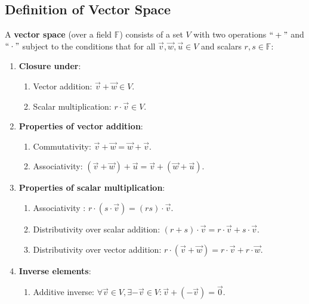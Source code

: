 \subsection{Definition of Vector Space}
\begin{definition}
	\label{def:vector_space}
	A \textbf{vector space} (over a field $\mathbb{F}$) consists of a set $V$ with two operations $``+"$ and $``\cdot"$ subject to the conditions that for all $\vec{v}, \vec{w}, \vec{u}\in V$ and scalars $r, s\in\mathbb{F}$:
	\begin{enumerate}
		\item \textbf{Closure under}:
		\begin{enumerate}[label=\roman*]
			\item Vector addition: $\vec{v} + \vec{w} \in V$.
			\item Scalar multiplication: $r\cdot\vec{v} \in V$.
		\end{enumerate}

		\item \textbf{Properties of vector addition}:
		\begin{enumerate}[label=\roman*]\addtocounter{enumii}{2}
			\item Commutativity: $\vec{v} + \vec{w} = \vec{w} + \vec{v}$.
			\item Associativity: $(\vec{v} + \vec{w}) + \vec{u} = \vec{v} + (\vec{w} + \vec{u})$.
		\end{enumerate} 

		\item \textbf{Properties of scalar multiplication}:
		\begin{enumerate}[label=\roman*]\addtocounter{enumii}{4}
			\item Associativity : $r\cdot(s\cdot\vec{v}) = (rs)\cdot \vec{v}$.
			\item Distributivity over scalar addition: $(r+s)\cdot\vec{v} = r\cdot\vec{v} + s\cdot\vec{v}$.	
			\item Distributivity over vector addition: $r\cdot(\vec{v} + \vec{w}) = r\cdot\vec{v} + r\cdot\vec{w}$.
		\end{enumerate} 

		\item \textbf{Inverse elements}:
		\begin{enumerate}[label=\roman*]\addtocounter{enumii}{7}
			\item Additive inverse: $\forall \vec{v}\in V, \exists -\vec{v}\in V: \vec{v} + (-\vec{v}) = \vec{0}$.	
		\end{enumerate} 


\end{enumerate}
\end{definition}
